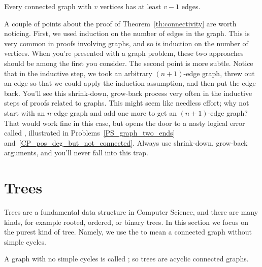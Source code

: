 \begin{corollary}
\label{cor:n-1}
Every connected graph with $v$ vertices has at least $v - 1$ edges.
\end{corollary}

A couple of points about the proof of Theorem~\ref{th:connectivity} are
worth noticing.  First, we used induction on the number of
edges in the graph.  This is very common in proofs involving graphs, and
so is induction on the number of vertices.  When you're presented with a
graph problem, these two approaches should be among the first you
consider.  The second point is more subtle.  Notice that in the inductive
step, we took an arbitrary $(n+1)$-edge graph, threw out an edge so that
we could apply the induction assumption, and then put the edge back.
You'll see this shrink-down, grow-back process very often in the inductive
steps of proofs related to graphs.  This might seem like needless effort;
why not start with an $n$-edge graph and add one more to get an
$(n+1)$-edge graph?  That would work fine in this case, but opens the door
to a nasty logical error called , illustrated in
Problems~\ref{PS_graph_two_ends} and~\ref{CP_pos_deg_but_not_connected}.
Always use shrink-down, grow-back arguments, and you'll never fall into
this trap.


\begin{problems}
\classproblems
{}

\homeworkproblems
{}
\end{problems}


\section{Trees}\label{trees-sec}
Trees are a fundamental data structure in Computer Science, and there are
many kinds, for example rooted, ordered, or binary trees.  In this section
we focus on the purest kind of tree.  Namely, we use the  to
mean a connected graph without simple cycles.

A graph with no simple cycles is called ; so trees are
acyclic connected graphs.

